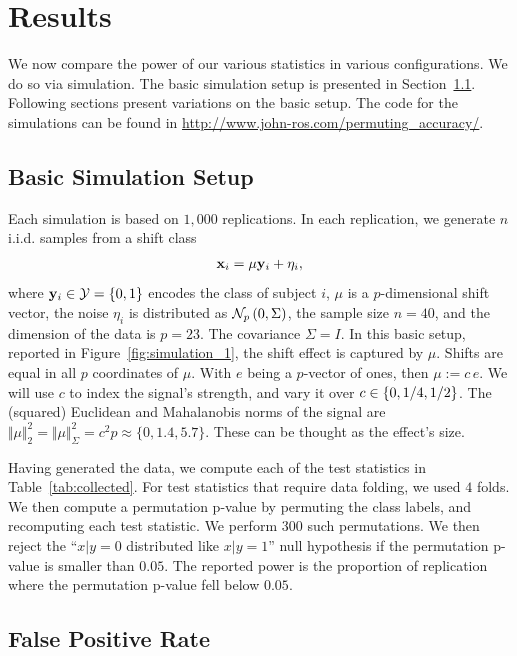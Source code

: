 \documentclass[journal]{IEEEtran}
\begin{document}
\section{Results}
\label{sec:results}
We now compare the power of our various statistics in various configurations. 
We do so via simulation.
The basic simulation setup is presented in Section~\ref{sec:simulation_details}.
Following sections present variations on the basic setup.
The \R code for the simulations can be found in \url{http://www.john-ros.com/permuting_accuracy/}.


\subsection{Basic Simulation Setup}
\label{sec:simulation_details}

Each simulation is based on $1,000$ replications. 
In each replication, we generate $n$ i.i.d. samples from a shift class 
\begin{align}
\label{eq:distribution}
\x_i = \mu \y_i + \eta_i,
\end{align}
where $\mathbf{y}_i \in \mathcal{Y}=\{ 0,1 \}$ encodes the class of subject $i$, $\mu$ is a $p$-dimensional shift vector, the noise $\eta_i$ is distributed as $\mathcal{N}_{p}\left(0,\Sigma\right)$, the sample size $n=40$, and the dimension of the data is $p=23$. 
The covariance $\Sigma=I$. 
In this basic setup, reported in Figure~\ref{fig:simulation_1}, the shift effect is captured by $\mu$. 
Shifts are equal in all $p$ coordinates of $\mu$.
With $e$ being a $p$-vector of ones, then $\mu:=c \, e$. 
We will use $c$ to index the signal's strength, and vary it over $c \in \{ 0,1/4,1/2 \}$.
The (squared) Euclidean and Mahalanobis norms of the signal are $\Vert \mu \Vert_2^2=\Vert \mu \Vert_\Sigma^2=c^2 p\approx \{0,1.4,5.7\}$.
These can be thought as the effect's size. 


Having generated the data, we compute each of the test statistics in Table~\ref{tab:collected}.
For test statistics that require data folding, we used $4$ folds. 
We then compute a permutation p-value by permuting the class labels, and recomputing each test statistic. 
We perform $300$ such permutations. 
We then reject the ``$x|y=0$ distributed like $x|y=1$'' null hypothesis if the permutation p-value is smaller than $0.05$.
The reported power is the proportion of replication where the permutation p-value fell below $0.05$.



\subsection{False Positive Rate}
\label{sec:type_i}
\end{document}

